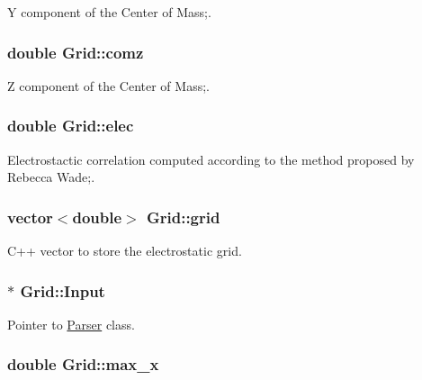 Y component of the Center of Mass;. 

\hypertarget{classGrid_a8cbad1d609a7592a19b065f7ad647f8a}{
\subsubsection[{comz}]{\setlength{\rightskip}{0pt plus 5cm}double {\bf Grid::comz}}}
\label{classGrid_a8cbad1d609a7592a19b065f7ad647f8a}


Z component of the Center of Mass;. 

\hypertarget{classGrid_afbb458694097a88a996838a131f61ead}{
\subsubsection[{elec}]{\setlength{\rightskip}{0pt plus 5cm}double {\bf Grid::elec}}}
\label{classGrid_afbb458694097a88a996838a131f61ead}


Electrostactic correlation computed according to the method proposed by Rebecca Wade;. 

\hypertarget{classGrid_ac9dcc7447af2497822b6e6e22be45f7e}{
\subsubsection[{grid}]{\setlength{\rightskip}{0pt plus 5cm}vector$<$double$>$ {\bf Grid::grid}}}
\label{classGrid_ac9dcc7447af2497822b6e6e22be45f7e}


C++ vector to store the electrostatic grid. 

\hypertarget{classGrid_aa9824cf9539971c3d32e92532c9c37be}{
\subsubsection[{Input}]{$\ast$ {\bf Grid::Input}}}
\label{classGrid_aa9824cf9539971c3d32e92532c9c37be}


Pointer to \hyperlink{classParser}{Parser} class. 

\hypertarget{classGrid_a72ca32ea381e695f8705fcd3ff248523}{
\subsubsection[{max\_\-x}]{\setlength{\rightskip}{0pt plus 5cm}double {\bf Grid::max\_\-x}}}
\label{classGrid_a72ca32ea381e695f8705fcd3ff248523}


